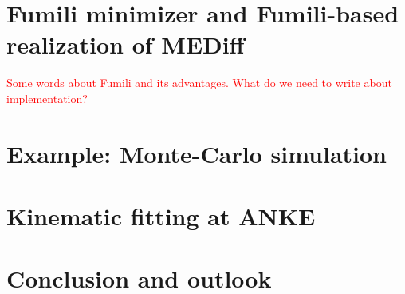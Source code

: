 \documentclass{webofc}
\begin{document}
\section{Fumili minimizer and Fumili-based realization of MEDiff}
\textcolor{red}{Some words about Fumili and its advantages.}
% 
\textcolor{red}{What do we need to write about implementation?}

\section{Example: Monte-Carlo simulation}

\section{Kinematic fitting at ANKE}
% 
\section{Conclusion and outlook}

\end{document}
